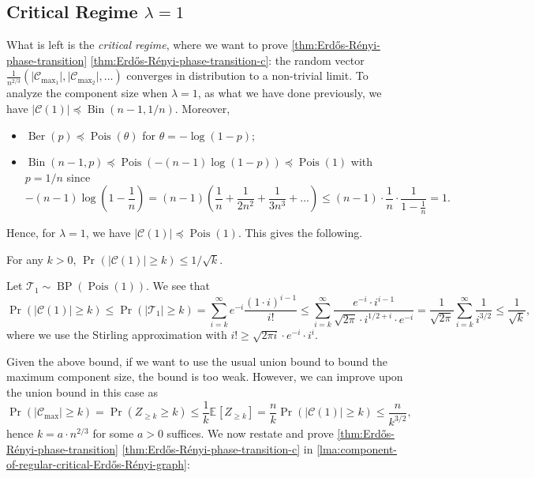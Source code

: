 \subsection{Critical Regime \(\lambda = 1\)}
What is left is the \emph{critical regime}, where we want to prove \autoref{thm:Erdős-Rényi-phase-transition} \autoref{thm:Erdős-Rényi-phase-transition-c}: the random vector \(\frac{1}{n^{2 / 3}} (\lvert \mathcal{C} _{\max _1} \rvert , \lvert \mathcal{C} _{\max _2} \rvert , \dots )\) converges in distribution to a non-trivial limit. To analyze the component size when \(\lambda = 1\), as what we have done previously, we have \(\lvert \mathcal{C} (1) \rvert \preceq \operatorname{Bin}(n-1, 1 / n) \). Moreover,
\begin{itemize}
	\item \(\operatorname{Ber}(p) \preceq \operatorname{Pois}(\theta ) \) for \(\theta = - \log (1 - p)\);
	\item \(\operatorname{Bin}(n-1, p) \preceq \operatorname{Pois}(- (n-1) \log (1 - p)) \preceq \operatorname{Pois}(1) \) with \(p = 1 / n\) since
	      \[
		      - (n-1) \log \left( 1 - \frac{1}{n} \right)
		      = (n-1) \left( \frac{1}{n} + \frac{1}{2n^2} + \frac{1}{3n^3} + \dots \right)
		      \leq (n-1) \cdot \frac{1}{n} \cdot \frac{1}{1-\frac{1}{n}}
		      = 1.
	      \]
\end{itemize}
Hence, for \(\lambda = 1\), we have \(\lvert \mathcal{C} (1) \rvert \preceq \operatorname{Pois}(1) \). This gives the following.

\begin{claim}
	For any \(k > 0\), \(\Pr_{}(\lvert \mathcal{C} (1) \rvert \geq k) \leq 1 / \sqrt{k} \).
\end{claim}
\begin{explanation}
	Let \(\mathcal{T} _1 \sim \operatorname{BP}(\operatorname{Pois}(1) ) \). We see that
	\[
		\Pr_{}(\lvert \mathcal{C} (1) \rvert \geq k)
		\leq \Pr_{}(\lvert \mathcal{T} _1 \rvert \geq k)
		= \sum_{i=k}^{\infty} e^{-i} \frac{(1 \cdot i)^{i-1}}{i!}
		\leq \sum_{i=k}^{\infty} \frac{e^{-i} \cdot i^{i-1}}{\sqrt{2\pi } \cdot i^{1 / 2 + i} \cdot e^{-i}}
		= \frac{1}{\sqrt{2\pi } } \sum_{i=k}^{\infty} \frac{1}{i^{3 / 2}}
		\leq \frac{1}{\sqrt{k} },
	\]
	where we use the Stirling approximation with \(i! \geq \sqrt{2 \pi i} \cdot e^{-i} \cdot i^i\).
\end{explanation}

Given the above bound, if we want to use the usual union bound to bound the maximum component size, the bound is too weak. However, we can improve upon the union bound in this case as
\[
	\Pr_{}(\lvert \mathcal{C} _{\max } \rvert \geq k)
	= \Pr_{}(Z_{\geq k} \geq k)
	\leq \frac{1}{k} \mathbb{E}_{}[Z_{\geq k}]
	= \frac{n}{k} \Pr_{}(\lvert \mathcal{C} (1) \rvert \geq k)
	\leq \frac{n}{k^{3 / 2}},
\]
hence \(k = a \cdot n^{2 / 3}\) for some \(a > 0\) suffices. We now restate and prove \autoref{thm:Erdős-Rényi-phase-transition} \autoref{thm:Erdős-Rényi-phase-transition-c} in \autoref{lma:component-of-regular-critical-Erdős-Rényi-graph}:

